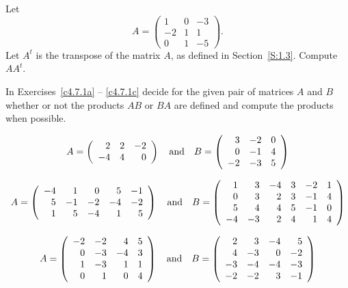 \documentclass{ximera}
\begin{document}
\begin{exercise} \label{c4.6.3}
Let
\[
A = \left(\begin{array}{rrr} 1 & 0 & -3\\ -2 & 1 & 1 \\ 0 & 1 & -5 \end{array}
\right).
\]
Let $A^t$ is the transpose of the matrix $A$, as defined in
Section~\ref{S:1.3}. Compute $AA^t$.
\end{exercise}

\CEXER

\noindent In Exercises~\ref{c4.7.1a} -- \ref{c4.7.1c} decide for the
given pair of matrices $A$ and $B$ whether or not the products $AB$ or
$BA$ are defined and compute the products when possible.
\begin{exercise} \label{c4.7.1a}
\begin{equation*}
A=\left(\begin{array}{rrr} 2  &  2  & -2 \\ -4  &  4  &  0
\end{array}\right) \quad\mbox{and}\quad
B=\left(\begin{array}{rrr} 3 &  -2  &  0\\ 0 &  -1 &   4\\ -2 &  -3
&   5
\end{array}\right)
\end{equation*}
\end{exercise}
\begin{exercise} \label{c4.7.1b}
\begin{equation*}
A=\left(\begin{array}{rrrrr}  -4  &  1  &  0  &  5  & -1\\
5  & -1  & -2  & -4  & -2\\ 1  &  5 &  -4   & 1  &  5
\end{array}\right) \quad\mbox{and}\quad
B=\left(\begin{array}{rrrrrr} 1  &  3  & -4  &  3  & -2  &  1\\
0  &  3  &  2  &  3  & -1  &  4\\ 5  &  4  &  4  &  5  & -1  &  0\\
-4  & -3  &  2  &  4  &  1  &  4
\end{array}\right)
\end{equation*}
\end{exercise}
\begin{exercise} \label{c4.7.1c}
\begin{equation*}
A=\left(\begin{array}{rrrr}  -2  & -2  &  4  &  5\\
 0  & -3  & -4  &  3\\ 1  & -3  &  1  &  1\\ 0  &  1  &  0  &  4
\end{array}\right) \quad\mbox{and}\quad
B=\left(\begin{array}{rrrr} 2  &  3  & -4  &  5\\
4  & -3  &  0  & -2\\ -3 &  -4  & -4 &  -3\\ -2  & -2  &  3  & -1
\end{array}\right)
\end{equation*}
\end{exercise}
\end{document}
